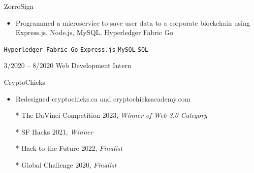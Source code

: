 \documentclass[9pt]{developercv} %
\begin{document}
\begin{entrylist}
{        ZorroSign
        \vspace{5pt}
        \begin{itemize}[noitemsep,topsep=0pt,parsep=0pt,partopsep=0pt, leftmargin=-1pt]
            \item Programmed a microservice to save user data to a corporate blockchain using Express.js, Node.js, MySQL, Hyperledger Fabric Go
        \end{itemize}
        \vspace{5pt}
        \texttt{Hyperledger Fabric Go} \slashsep \texttt{Express.js} \slashsep \texttt{MySQL} \slashsep \texttt{SQL}}

        \entry
		{3/2020 -- 8/2020}
		{Web Development Intern}
		{}
		{\vspace{-10pt}
  
        CryptoChicks
        \vspace{5pt}
        \begin{itemize}[noitemsep,topsep=0pt,parsep=0pt,partopsep=0pt, leftmargin=-1pt]
            \item Redesigned cryptochicks.ca and cryptochicksacademy.com
        \end{itemize} 
        }
\end{entrylist}

\begin{enumerate}
    \item[*] The DaVinci Competition 2023, \textit{Winner of Web 3.0 Category}
    \item[*] SF Hacks 2021, \textit{Winner}
    \item[*] Hack to the Future 2022, \textit{Finalist}
    \item[*] Global Challenge 2020, \textit{Finalist}
\end{enumerate}

\vspace{10pt}
\end{document}
